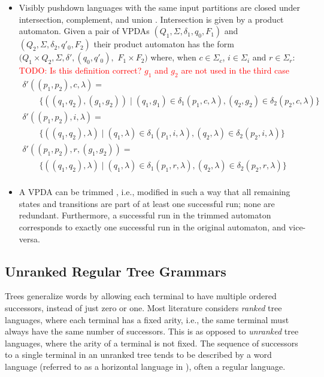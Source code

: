 \documentclass[runningheads]{llncs}
\newcommand{\T}{\Sigma} %
\newcommand{\RED}[1]{\textcolor{red}{#1}}
\begin{document}
\begin{itemize}
\item Visibly pushdown languages with the same input partitions
  are closed under intersection, complement, and union
  \cite{alurVisiblyPushdownLanguages2004}. Intersection is given
  by a product automaton. Given a pair of VPDAs
  $(Q_1, \T, \delta_1, q_0, F_1)$ and
  $(Q_2, \T, \delta_2, q'_0, F_2)$ their product automaton has the
  form $(Q_1 \times Q_2, \T, \delta', (q_0, q'_0),$
  $ F_1 \times F_2)$ where, when $c \in \T_c$, $i \in \T_i$ and
  $r \in \T_r$: \RED{TODO: Is this definition correct? $g_1$ and
    $g_2$ are not used in the third case}
  \[
  \begin{array}{l}
    \delta'((p_1, p_2), c, \lambda) =\\ \qquad\{((q_1, q_2), (g_1, g_2)) \mid (q_1, g_1) \in \delta_1(p_1, c, \lambda), (q_2, g_2) \in \delta_2(p_2, c, \lambda) \}\\
    \delta'((p_1, p_2), i, \lambda) =\\ \qquad \{((q_1, q_2), \lambda) \mid (q_1, \lambda) \in \delta_1(p_1, i, \lambda), (q_2, \lambda) \in \delta_2(p_2, i, \lambda) \}\\
    \delta'((p_1, p_2), r, (g_1, g_2)) =\\ \qquad \{((q_1, q_2), \lambda) \mid (q_1, \lambda) \in \delta_1(p_1, r, \lambda), (q_2, \lambda) \in \delta_2(p_2, r, \lambda) \}\\
  \end{array}
  \]

\item A VPDA can be trimmed \cite{caralpTrimmingVisiblyPushdown2015}, i.e., modified in such a way that all remaining states and transitions are part of at least one successful run; none are redundant. Furthermore, a successful run in the trimmed automaton corresponds to exactly one successful run in the original automaton, and vice-versa.
\end{itemize}

\subsection{Unranked Regular Tree Grammars} \label{sec:preliminaries-trees}

Trees generalize words by allowing each terminal to have multiple ordered successors, instead of just zero or one. Most literature considers \emph{ranked} tree languages, where each terminal has a fixed arity, i.e., the same terminal must always have the same number of successors. This is as opposed to \emph{unranked} tree languages, where the arity of a terminal is not fixed. The sequence of successors to a single terminal in an unranked tree tends to be described by a word language (referred to as a horizontal language in \cite{comonTreeAutomataTechniques2007}), often a regular language.
\end{document}
